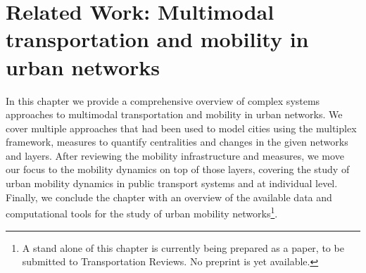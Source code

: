 \chapter{Related Work: Multimodal transportation and mobility in urban networks}\label{ch:litReview}

In this chapter we provide a comprehensive overview of complex systems approaches to multimodal transportation and mobility in urban networks. We cover multiple approaches that had been used to model cities using the multiplex framework, measures to quantify centralities and changes in the given networks and layers. After reviewing the mobility infrastructure and measures, we move our focus to the mobility dynamics on top of those layers, covering the study of urban mobility dynamics in public transport systems and at individual level. Finally, we conclude the chapter with an overview of the available data and computational tools for the study of urban mobility networks\footnote{A stand alone of this chapter is currently being prepared as a paper, to be submitted to Transportation Reviews. No preprint is yet available.}.

\pagebreak


